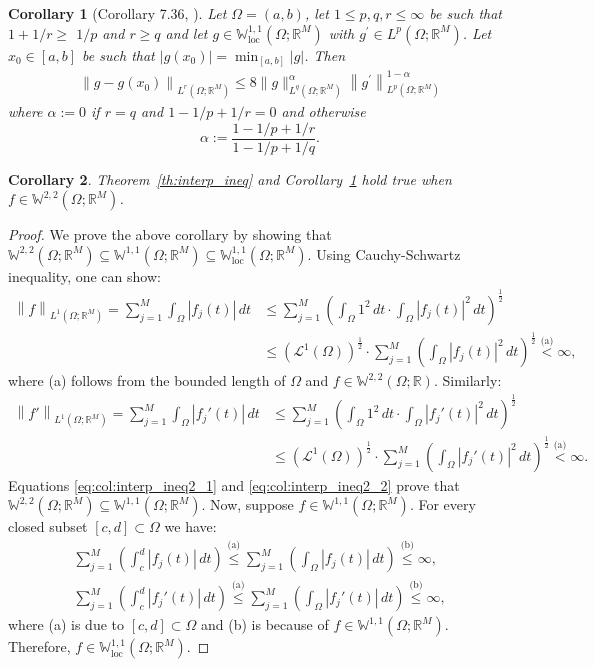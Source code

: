 \documentclass{article}
\newtheorem{corollary}{Corollary}
\newcommand{\norm}[1]{\left\lVert#1\right\rVert}
\newcommand{\lpm}[1]{{L}^{#1}\left(\Omega; \mathbb{R}^M\right)}
\newcommand{\soblocm}[2]{\mathbb{W}_{\textrm{loc}}^{#1,#2}\left(\Omega; \mathbb{R}^M\right)}
\newcommand{\sob}[2]{\mathbb{W}^{#1,#2}\left(\Omega; \mathbb{R}\right)}
\newcommand{\sobm}[2]{\mathbb{W}^{#1,#2}\left(\Omega; \mathbb{R}^M\right)}
\newcommand{\lec}[2]{\stackrel{\text{#1}}{#2}}
\begin{document}
\begin{corollary}[Corollary 7.36, \citep{leoni2024first}] \label{cor:interp_ineq_2}
     Let $\Omega=(a, b)$, let $1 \leq p, q, r \leq \infty$ be such that $1+1 / r \geq$ $1 / p$ and $r \geq q$ and let $g \in \soblocm{1}{1}$ with $g^{\prime} \in \lpm{p}$. Let $x_0 \in[a, b]$ be such that $\left|g\left(x_0\right)\right|=\min _{[a, b]}|g|$. Then
\begin{align}
\left\|g-g\left(x_0\right)\right\|_{\lpm{r}} \leq 8\|g\|_{\lpm{q}}^\alpha\left\|g^{\prime}\right\|_{\lpm{p}}^{1-\alpha}
\end{align}
where $\alpha:=0$ if $r=q$ and $1-1 / p+1 / r=0$ and otherwise
$$
\alpha:=\frac{1-1 / p+1 / r}{1-1 / p+1 / q}.
$$
\end{corollary}

\begin{corollary}\label{col:interp_ineq2}
Theorem~\ref{th:interp_ineq} and Corollary~\ref{cor:interp_ineq_2} hold true when $f \in \sobm{2}{2}$.
\end{corollary}
\begin{proof}
    We prove the above corollary by showing that $\sobm{2}{2} \subseteq \sobm{1}{1} \subseteq \soblocm{1}{1}$.
    Using Cauchy-Schwartz inequality, one can show:
    \begin{align}\label{eq:col:interp_ineq2_1}
        \norm{f}_{\lpm{1}} = \sum_{j=1}^M \int_{\Omega} |f_j(t)|\,dt &\leqslant \sum_{j=1}^M \left(\int_{\Omega} 1^2\,dt\cdot\int_{\Omega} |f_j(t)|^2\,dt\right)^{\frac{1}{2}} \nonumber \\ &\leqslant \left(\mathcal{L}^1(\Omega)\right)^\frac{1}{2}\cdot \sum_{j=1}^M \left(\int_{\Omega} |f_j(t)|^2\,dt\right)^{\frac{1}{2}} \lec{(a)}{<} \infty,
    \end{align}
    where (a) follows from the bounded length of $\Omega$ and $f \in \sob{2}{2}$. Similarly:
    \begin{align}\label{eq:col:interp_ineq2_2}
        \norm{f'}_{\lpm{1}} = \sum_{j=1}^M \int_{\Omega} |f_j'(t)|\,dt &\leqslant \sum_{j=1}^M \left(\int_{\Omega} 1^2\,dt\cdot\int_{\Omega} |f_j'(t)|^2\,dt\right)^{\frac{1}{2}} \nonumber \\ &\leqslant \left(\mathcal{L}^1(\Omega)\right)^\frac{1}{2}\cdot \sum_{j=1}^M \left(\int_{\Omega} |f_j'(t)|^2\,dt\right)^{\frac{1}{2}} \lec{(a)}{<} \infty.
    \end{align}
    Equations \eqref{eq:col:interp_ineq2_1} and \eqref{eq:col:interp_ineq2_2} prove that $\sobm{2}{2} \subseteq \sobm{1}{1}$. Now, suppose $f\in\sobm{1}{1}$. For every closed subset $[c,d] \subset \Omega$ we have:
    \begin{align}
        \sum_{j=1}^M \left(\int^d_c |f_j(t)|\,dt\right) \lec{(a)}{\leqslant} \sum_{j=1}^M \left(\int_\Omega |f_j(t)|\,dt\right) \lec{(b)}{\leqslant} \infty, \\
        \sum_{j=1}^M \left(\int^d_c |f_j'(t)|\,dt\right) \lec{(a)}{\leqslant} \sum_{j=1}^M \left(\int_\Omega |f_j'(t)|\,dt\right) \lec{(b)}{\leqslant} \infty,
    \end{align}
    where (a) is due to $[c,d] \subset \Omega$ and (b) is because of $f\in\sobm{1}{1}$. Therefore, $f \in \soblocm{1}{1}$.
\end{proof}
\end{document}
